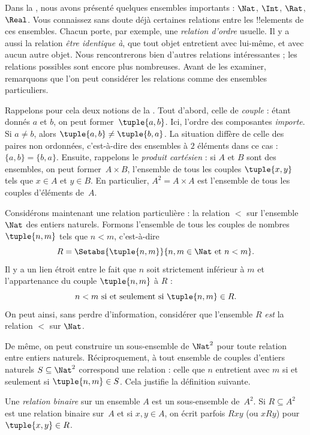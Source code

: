 \documentclass[../../../include/open-logic-section]{subfiles}
\begin{document}

\begin{explain}
Dans la , nous avons présenté quelques
ensembles importants : $\Nat$, $\Int$, $\Rat$, $\Real$.
Vous connaissez sans doute déjà certaines relations entre les
!!{element}s de ces ensembles. Chacun porte, par exemple,
une \emph{relation d'ordre} usuelle. Il y a aussi la relation
\emph{être identique à}, que tout objet entretient avec lui-même,
et avec aucun autre objet. Nous rencontrerons bien d'autres
relations intéressantes ; les relations possibles sont encore
plus nombreuses. Avant de les examiner, remarquons que l'on
peut considérer les relations comme des ensembles particuliers.

Rappelons pour cela deux notions de la .
Tout d'abord, celle de \emph{couple} : étant donnés $a$ et $b$,
on peut former~$\tuple{a, b}$. Ici, l'ordre des composantes
\emph{importe}. Si $a \neq b$, alors
$\tuple{a, b} \neq \tuple{b, a}$.
La situation diffère de celle des paires non ordonnées,
c'est-à-dire des ensembles à $2$ éléments dans ce cas :
$\{a, b\}=\{b, a\}$.
Ensuite, rappelons le \emph{produit cartésien} : si $A$ et $B$
sont des ensembles, on peut former~$A \times B$, l'ensemble
de tous les couples $\tuple{x, y}$ tels que $x \in A$ et $y \in B$.
En particulier, $A^{2}= A \times A$ est l'ensemble de tous
les couples d'éléments de~$A$.

Considérons maintenant une relation particulière :
la relation $<$ sur l'ensemble~$\Nat$ des entiers naturels.
Formons l'ensemble de tous les couples de nombres $\tuple{n, m}$
tels que $n<m$, c'est-à-dire
\[
  R=\Setabs{\tuple{n, m}}{n, m \in \Nat \text{ et } n<m}.
\]
Il y a un lien étroit entre le fait que $n$ soit strictement
inférieur à $m$ et l'appartenance du couple $\tuple{n, m}$ à $R$ :
\[
      n<m\text{ si et seulement si }\tuple{n, m} \in R.
\]
On peut ainsi, sans perdre d'information, considérer que
l'ensemble $R$ \emph{est} la relation $<$ sur $\Nat$.

De même, on peut construire un sous-ensemble de $\Nat^{2}$
pour toute relation entre entiers naturels.
Réciproquement, à tout ensemble de couples d'entiers naturels
$S \subseteq \Nat^{2}$ correspond une relation :
celle que $n$ entretient avec $m$ si et seulement si
$\tuple{n, m} \in S$. Cela justifie la définition suivante.
\end{explain}

\begin{defn}
Une \emph{relation binaire} sur un ensemble $A$ est un
sous-ensemble de~$A^{2}$. Si $R \subseteq A^{2}$ est
une relation binaire sur~$A$ et si $x, y \in A$,
on écrit parfois $Rxy$ (ou $xRy$) pour $\tuple{x, y} \in R$.
\end{defn}
\end{document}
